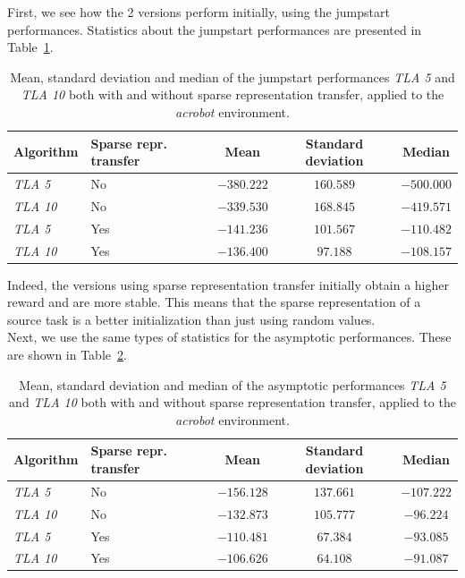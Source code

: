 First, we see how the 2 versions perform initially, using the jumpstart performances. Statistics about the jumpstart performances are presented in Table~\ref{tab:acrobot:sparse:stats}.
\begin{table}[htb]
    \centering
    \begin{tabular}{llccc}
    \hline
    Algorithm & Sparse repr. transfer & Mean & Standard deviation & Median \\
    \hline
       \textit{TLA 5} & No & $-380.222$ & $160.589$ & $-500.000$ \\
       \textit{TLA 10} & No & $-339.530$ & $168.845$ & $-419.571$ \\
       \textit{TLA 5} & Yes & $-141.236$ & $101.567$ & $-110.482$ \\
       \textit{TLA 10} & Yes & $\bm{-136.400}$ & $97.188$ & $\bm{-108.157}$ \\
    \hline
    \end{tabular}
    \caption{Mean, standard deviation and median of the jumpstart performances \textit{TLA 5} and \textit{TLA 10} both with and without sparse representation transfer, applied to the \textit{acrobot} environment.}
    \label{tab:acrobot:sparse:stats}
\end{table}
Indeed, the versions using sparse representation transfer initially obtain a higher reward and are more stable. This means that the sparse representation of a source task is a better initialization than just using random values.\\
Next, we use the same types of statistics for the asymptotic performances.
These are shown in Table~\ref{tab:acrobot:sparse:asymp:stats}.
\begin{table}[htb]
    \centering
    \begin{tabular}{llccc}
    \hline
    Algorithm & Sparse repr. transfer & Mean & Standard deviation & Median \\
    \hline
       \textit{TLA 5} & No & $-156.128$ & $137.661$ & $-107.222$ \\
       \textit{TLA 10} & No & $-132.873$ & $105.777$ & $-96.224$ \\
       \textit{TLA 5} & Yes & $-110.481$ & $67.384$ & $-93.085$ \\
       \textit{TLA 10} & Yes & $\bm{-106.626}$ & $64.108$ & $\bm{-91.087}$ \\
    \hline
    \end{tabular}
    \caption{Mean, standard deviation and median of the asymptotic performances \textit{TLA 5} and \textit{TLA 10} both with and without sparse representation transfer, applied to the \textit{acrobot} environment.}
    \label{tab:acrobot:sparse:asymp:stats}
\end{table}
